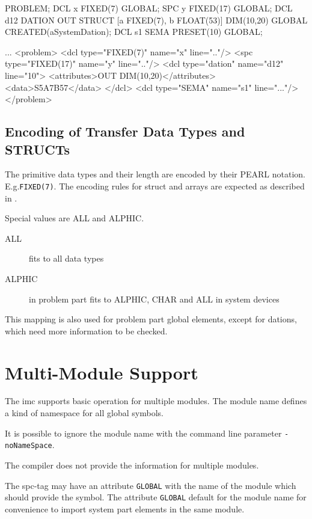 \begin{PEARLCode}
PROBLEM;
   DCL x FIXED(7) GLOBAL;
   SPC y FIXED(17) GLOBAL;
   DCL d12 DATION OUT STRUCT [a FIXED(7), b FLOAT(53)]
     DIM(10,20)  GLOBAL CREATED(aSystemDation);
   DCL s1 SEMA PRESET(10) GLOBAL;
\end{PEARLCode}

\begin{XMLCode}
...
<problem>
  <dcl type="FIXED(7)" name="x" line=".."/>
  <spc type="FIXED(17)" name="y" line=".."/>
  <dcl type="dation" name="d12" line="10">
    <attributes>OUT DIM(10,20)</attributes>
    <data>S5A7B57</data>
  </dcl>
  <dcl type="SEMA" name="s1" line="..."/>
</problem>
\end{XMLCode}


\subsection{Encoding of Transfer Data Types and STRUCTs}
\label{encoding}
The primitive data types and their length are encoded 
by their PEARL notation.  E.g.\verb|FIXED(7)|. The encoding rules
for struct and arrays are expected as described in \cite{runtime}. 

Special values are ALL and ALPHIC.

\begin{description}
\item[ALL] fits to all data types
\item[ALPHIC] in problem part fits to ALPHIC, CHAR and ALL in system devices
\end{description}

This mapping is also used for problem part global elements, except for dations,
which need more information to be checked.

\section{Multi-Module Support}
The imc supports basic operation for multiple modules.
The module name defines a kind of namespace for all global symbols.

It is possible to ignore the module name with the command line parameter 
\texttt{-noNameSpace}.

The compiler does not provide the information for multiple modules.

The spc-tag may have an attribute \texttt{GLOBAL} with the name of
the module which should provide the symbol. The attribute \texttt{GLOBAL} 
default for the module name for convenience to import system part elements
in the same module.

